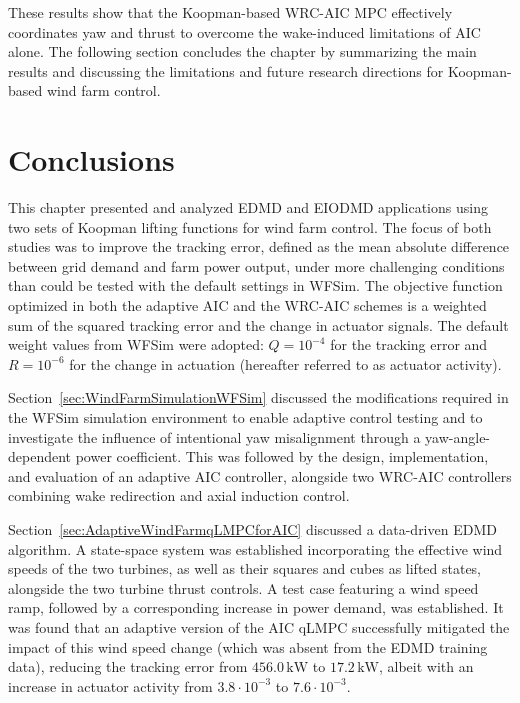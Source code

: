 %


These results show that the Koopman-based WRC-AIC MPC effectively coordinates yaw and thrust to overcome the wake-induced limitations of AIC alone. The following section concludes the chapter by summarizing the main results and discussing the limitations and future research directions for Koopman-based wind farm control.


\section{Conclusions}
This chapter presented and analyzed EDMD and EIODMD applications using two sets of Koopman lifting functions for wind farm control. The focus of both studies was to improve the tracking error, defined as the mean absolute difference between grid demand and farm power output, under more challenging conditions than could be tested with the default settings in WFSim. The objective function optimized in both the adaptive AIC and the WRC-AIC schemes is a weighted sum of the squared tracking error and the change in actuator signals. The default weight values from WFSim were adopted: $Q = 10^{-4}$ for the tracking error and $R = 10^{-6}$ for the change in actuation (hereafter referred to as actuator activity). 

Section~\ref{sec:WindFarmSimulationWFSim} discussed the modifications required in the WFSim simulation environment to enable adaptive control testing and to investigate the influence of intentional yaw misalignment through a yaw-angle-dependent power coefficient. This was followed by the design, implementation, and evaluation of an adaptive AIC controller, alongside two WRC-AIC controllers combining wake redirection and axial induction control.

Section~\ref{sec:AdaptiveWindFarmqLMPCforAIC} discussed a data-driven EDMD algorithm. A state-space system was established incorporating the effective wind speeds of the two turbines, as well as their squares and cubes as lifted states, alongside the two turbine thrust controls. A test case featuring a wind speed ramp, followed by a corresponding increase in power demand, was established. It was found that an adaptive version of the AIC qLMPC successfully mitigated the impact of this wind speed change (which was absent from the EDMD training data), reducing the tracking error from $456.0\,\text{kW}$ to $17.2\,\text{kW}$, albeit with an increase in actuator activity from $3.8 \cdot 10^{-3}$ to $7.6 \cdot 10^{-3}$. 

